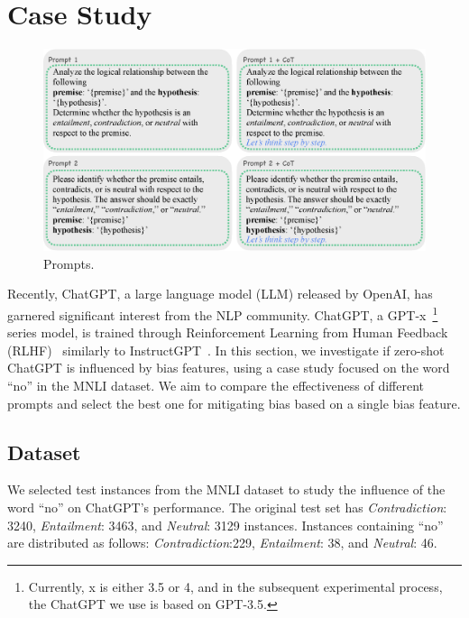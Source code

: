 \section{Case Study}
\label{sec:mitigatingbiases}
\begin{figure}[th]
\centering
\includegraphics[width=1.6\columnwidth]{picture/prompt.eps}
\caption{Prompts. }
\label{fig:prompt}
\end{figure}

Recently, ChatGPT, a large language model (LLM) released by OpenAI, has garnered significant interest 
from the NLP community.
ChatGPT, a GPT-x~\footnote{Currently, x is either 3.5 or 4, and in the subsequent experimental process, the ChatGPT we use is based on GPT-3.5.} series model, 
is trained through Reinforcement Learning from Human Feedback (RLHF)~\cite{christiano2017deep} similarly to InstructGPT~\cite{ouyang2022training}.
In this section, we investigate if zero-shot ChatGPT is influenced by bias features, using a case study focused on the word ``no'' in the MNLI dataset.
We aim to compare the effectiveness of different prompts and select the best one for mitigating bias 
based on a single bias feature. 

\subsection{Dataset}
\label{sec:chatgptdata}
We selected test instances from the MNLI dataset 
to study the influence of the word ``no'' on ChatGPT's performance. 
The original test set has \textit{Contradiction}: 3240, 
\textit{Entailment}: 3463, and \textit{Neutral}: 3129 instances. 
Instances containing ``no'' are distributed as follows: \textit{Contradiction}:229, 
\textit{Entailment}: 38, and \textit{Neutral}: 46.

